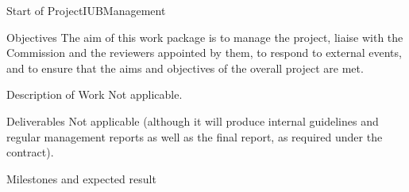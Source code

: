 \documentclass{euproposal}
\begin{document}
\begin{workpackage}{36}{0}{Start of Project}{IUB}{Management}
\begin{wpbox}{Objectives}
  The aim of this work package is to manage the project, liaise with
  the Commission and the reviewers appointed by them, to respond to
  external events, and to ensure that the aims and objectives of the
  overall project are met.
\end{wpbox}
\begin{wpbox}{Description of Work}
Not applicable.
\end{wpbox}
\begin{wpbox}{Deliverables}
  Not applicable (although it will produce internal guidelines and
  regular management reports as well as the final report, as required
  under the contract).
\end{wpbox}
\begin{wpbox}{Milestones and expected result}
\end{wpbox}
\end{workpackage}
\newpage
\end{document}
